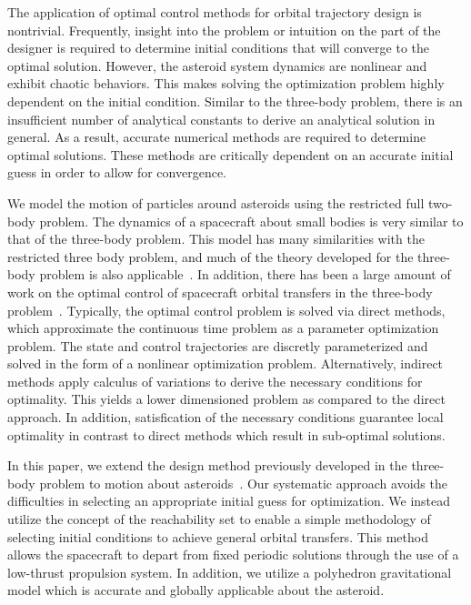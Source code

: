 The application of optimal control methods for orbital trajectory design is nontrivial.
Frequently, insight into the problem or intuition on the part of the designer is required to determine initial conditions that will converge to the optimal solution.
However, the asteroid system dynamics are nonlinear and exhibit chaotic behaviors.
This makes solving the optimization problem highly dependent on the initial condition.
Similar to the three-body problem, there is an insufficient number of analytical constants to derive an analytical solution in general.
As a result, accurate numerical methods are required to determine optimal solutions.
These methods are critically dependent on an accurate initial guess in order to allow for convergence.

We model the motion of particles around asteroids using the restricted full two-body problem.
The dynamics of a spacecraft about small bodies is very similar to that of the three-body problem.
This model has many similarities with the restricted three body problem, and much of the theory developed for the three-body problem is also applicable~\cite{mondelo2010,herrera2014}.
In addition, there has been a large amount of work on the optimal control of spacecraft orbital transfers in the three-body problem~\cite{mingotti2011,grebow2011}.
Typically, the optimal control problem is solved via direct methods, which approximate the continuous time problem as a parameter optimization problem.
The state and control trajectories are discretly parameterized and solved in the form of a nonlinear optimization problem.
Alternatively, indirect methods apply calculus of variations to derive the necessary conditions for optimality. 
This yields a lower dimensioned problem as compared to the direct approach.
In addition, satisfication of the necessary conditions guarantee local optimality in contrast to direct methods which result in sub-optimal solutions.

In this paper, we extend the design method previously developed in the three-body problem to motion about asteroids~\cite{kulumani2015}.
Our systematic approach avoids the difficulties in selecting an appropriate initial guess for optimization.
We instead utilize the concept of the reachability set to enable a simple methodology of selecting initial conditions to achieve general orbital transfers.
This method allows the spacecraft to depart from fixed periodic solutions through the use of a low-thrust propulsion system.
In addition, we utilize a polyhedron gravitational model which is accurate and globally applicable about the asteroid.

